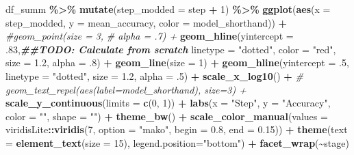 \documentclass[
]{article}
\newenvironment{Shaded}{\begin{snugshade}}{\end{snugshade}}
\newcommand{\AttributeTok}[1]{\textcolor[rgb]{0.13,0.29,0.53}{#1}}
\newcommand{\CommentTok}[1]{\textcolor[rgb]{0.56,0.35,0.01}{\textit{#1}}}
\newcommand{\DecValTok}[1]{\textcolor[rgb]{0.00,0.00,0.81}{#1}}
\newcommand{\DocumentationTok}[1]{\textcolor[rgb]{0.56,0.35,0.01}{\textbf{\textit{#1}}}}
\newcommand{\FloatTok}[1]{\textcolor[rgb]{0.00,0.00,0.81}{#1}}
\newcommand{\FunctionTok}[1]{\textcolor[rgb]{0.13,0.29,0.53}{\textbf{#1}}}
\newcommand{\NormalTok}[1]{#1}
\newcommand{\SpecialCharTok}[1]{\textcolor[rgb]{0.81,0.36,0.00}{\textbf{#1}}}
\newcommand{\StringTok}[1]{\textcolor[rgb]{0.31,0.60,0.02}{#1}}
\begin{document}
\begin{Shaded}
\begin{Highlighting}[]
\NormalTok{df\_summ }\SpecialCharTok{\%\textgreater{}\%}
  \FunctionTok{mutate}\NormalTok{(}\AttributeTok{step\_modded =}\NormalTok{ step }\SpecialCharTok{+} \DecValTok{1}\NormalTok{) }\SpecialCharTok{\%\textgreater{}\%}
  \FunctionTok{ggplot}\NormalTok{(}\FunctionTok{aes}\NormalTok{(}\AttributeTok{x =}\NormalTok{ step\_modded,}
             \AttributeTok{y =}\NormalTok{ mean\_accuracy,}
             \AttributeTok{color =}\NormalTok{ model\_shorthand)) }\SpecialCharTok{+}
  \CommentTok{\#geom\_point(size = 3,}
  \CommentTok{\#           alpha = .7) +}
  \FunctionTok{geom\_hline}\NormalTok{(}\AttributeTok{yintercept =}\NormalTok{ .}\DecValTok{83}\NormalTok{,}\DocumentationTok{\#\#TODO: Calculate from scratch}
             \AttributeTok{linetype =} \StringTok{"dotted"}\NormalTok{, }\AttributeTok{color =} \StringTok{"red"}\NormalTok{,}
             \AttributeTok{size =} \FloatTok{1.2}\NormalTok{, }\AttributeTok{alpha =}\NormalTok{ .}\DecValTok{8}\NormalTok{) }\SpecialCharTok{+} 
  \FunctionTok{geom\_line}\NormalTok{(}\AttributeTok{size =} \DecValTok{1}\NormalTok{) }\SpecialCharTok{+}
  \FunctionTok{geom\_hline}\NormalTok{(}\AttributeTok{yintercept =}\NormalTok{ .}\DecValTok{5}\NormalTok{, }\AttributeTok{linetype =} \StringTok{"dotted"}\NormalTok{,}
             \AttributeTok{size =} \FloatTok{1.2}\NormalTok{, }\AttributeTok{alpha =}\NormalTok{ .}\DecValTok{5}\NormalTok{) }\SpecialCharTok{+}
  \FunctionTok{scale\_x\_log10}\NormalTok{() }\SpecialCharTok{+}
  \CommentTok{\# geom\_text\_repel(aes(label=model\_shorthand), size=3) +}
  \FunctionTok{scale\_y\_continuous}\NormalTok{(}\AttributeTok{limits =} \FunctionTok{c}\NormalTok{(}\DecValTok{0}\NormalTok{, }\DecValTok{1}\NormalTok{)) }\SpecialCharTok{+}
  \FunctionTok{labs}\NormalTok{(}\AttributeTok{x =} \StringTok{"Step"}\NormalTok{,}
       \AttributeTok{y =} \StringTok{"Accuracy"}\NormalTok{,}
       \AttributeTok{color =} \StringTok{""}\NormalTok{,}
       \AttributeTok{shape =} \StringTok{""}\NormalTok{) }\SpecialCharTok{+}
  \FunctionTok{theme\_bw}\NormalTok{() }\SpecialCharTok{+}
  \FunctionTok{scale\_color\_manual}\NormalTok{(}\AttributeTok{values =}\NormalTok{ viridisLite}\SpecialCharTok{::}\FunctionTok{viridis}\NormalTok{(}\DecValTok{7}\NormalTok{, }\AttributeTok{option =} \StringTok{"mako"}\NormalTok{, }
                                                  \AttributeTok{begin =} \FloatTok{0.8}\NormalTok{, }\AttributeTok{end =} \FloatTok{0.15}\NormalTok{)) }\SpecialCharTok{+}
  \FunctionTok{theme}\NormalTok{(}\AttributeTok{text =} \FunctionTok{element\_text}\NormalTok{(}\AttributeTok{size =} \DecValTok{15}\NormalTok{),}
        \AttributeTok{legend.position=}\StringTok{"bottom"}\NormalTok{) }\SpecialCharTok{+}
  \FunctionTok{facet\_wrap}\NormalTok{(}\SpecialCharTok{\textasciitilde{}}\NormalTok{stage)}
\end{Highlighting}
\end{Shaded}
\end{document}
